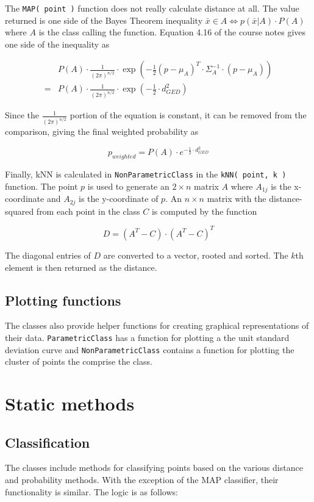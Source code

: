 The {\tt MAP( point )} function does not really calculate distance at all. The
value returned is one side of the Bayes Theorem inequality $\bar x \in A \iff p(\bar
x|A) \cdot P(A)$ where $A$ is the class calling the function. Equation 4.16 of
the course notes gives one side of the inequality as

\begin{align*}
&P(A) \cdot \frac{1}{(2
\pi)^{n/2}} \cdot \exp(-\frac{1}{2}(p - \mu_A)^T \cdot \Sigma_A^{-1} \cdot (p
- \mu_A)) \\
= &P(A) \cdot \frac{1}{(2 \pi)^{n/2}} \cdot \exp(-\frac{1}{2} \cdot d_{GED}^2)
\end{align*}

Since the $\frac{1}{(2 \pi)^{n/2}}$ portion of the equation is constant, it can
be removed from the comparison, giving the final weighted probability as

\begin{equation}
p_{weighted} = P(A) \cdot e^{-\frac{1}{2} \cdot d_{GED}^2}
\end{equation}

Finally, kNN is calculated in {\tt NonParametricClass} in the {\tt kNN( point,
k )} function. The point $p$ is used to generate an $2 \times n$ matrix
$A$ where $A_{1j}$ is the x-coordinate and $A_{2j}$ is the y-coordinate of $p$.
An $n \times n$ matrix with the distance-squared from each point in the class
$C$ is computed by the function

$$
D = (A^T-C) \cdot (A^T - C)^T
$$

The diagonal entries of $D$ are converted to a vector, rooted and sorted. The
$k$th element is then returned as the distance.

\subsection{Plotting functions}
The classes also provide helper functions for creating graphical
representations of their data. {\tt ParametricClass} has a function for
plotting a the unit standard deviation curve and {\tt NonParametricClass}
contains a function for plotting the cluster of points the comprise the class.

\section{Static methods}
\subsection{Classification}
The classes include methods for classifying points based on the various
distance and probability methods. With the exception of the MAP classifier,
their functionality is similar. The logic is as follows:

